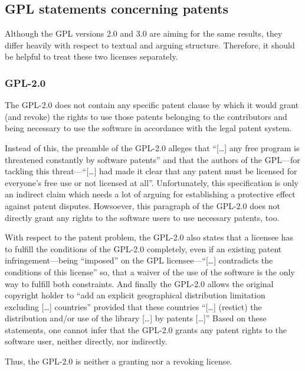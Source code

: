 \subsection{GPL statements concerning patents}

Although the GPL versions 2.0 and 3.0 are aiming for the same results, they
differ heavily with respect to textual and arguing structure. Therefore, it
should be helpful to treat these two licenses separately.

\subsubsection{GPL-2.0}

The GPL-2.0 does not contain any specific patent clause by which it would grant
(and revoke) the rights to use those patents belonging to the contributors and 
being necessary to use the software in accordance with the legal patent system.

Instead of this, the preamble of the GPL-2.0 alleges that \enquote{[\ldots] any
free program is threatened constantly by software patents} and that the authors
of the GPL---for tackling this threat---\enquote{[\ldots] had made it clear
that any patent must be licensed for everyone's free use or not licensed at
all}. Unfortunately, this specification is only an indirect
claim which needs a lot of arguing for establishing a protective effect against
patent disputes. Howsoever, this paragraph of the GPL-2.0 does not directly
grant any rights to the software users to use necessary patents, too.

With respect to the patent problem, the GPL-2.0 also states that a licensee has
to fulfill the conditions of the GPL-2.0 completely, even if an existing patent
infringement---being \enquote{imposed} on the GPL licensee---\enquote{[\ldots]
contradicts the conditions of this license} so, that a waiver of the use of the
software is the only way to fulfill both constraints. And
finally the GPL-2.0 allows the original copyright holder to \enquote{add an
explicit geographical distribution limitation excluding [\ldots] countries}
provided that these countries \enquote{[\ldots] (restict) the distribution
and/or use of the library [\ldots] by patents [\ldots]}
Based on these statements, one cannot infer that the GPL-2.0 grants any patent
rights to the software user, neither directly, nor indirectly.

Thus, the GPL-2.0 is neither a granting nor a revoking license.

